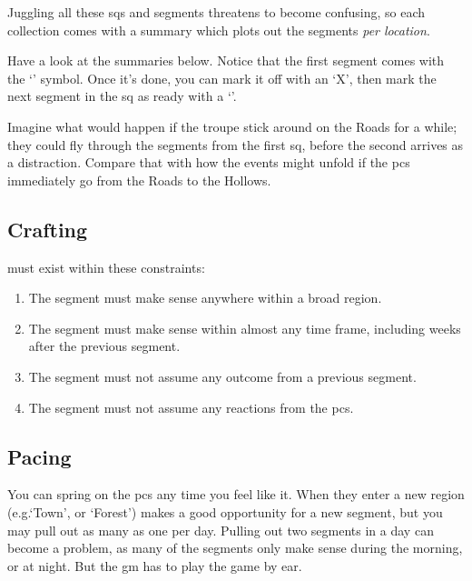 \begin{multicols}{2}

\noindent
Juggling all these \glspl{sq} and \glspl{segment} threatens to become confusing, so each collection comes with a summary which plots out the \glspl{segment} \emph{per location}.

Have a look at the summaries below.
Notice that the first \gls{segment} comes with the `\sqr' symbol.
Once it's done, you can mark it off with an `X', then mark the next \gls{segment} in the \gls{sq} as ready with a `\sqr'.

Imagine what would happen if the troupe stick around on the Roads for a while; they could fly through the \glspl{segment} from the first \gls{sq}, before the second arrives as a distraction.
Compare that with how the events might unfold if the \glspl{pc} immediately go from the Roads to the Hollows.




\subsection{Crafting }

 must exist within these constraints:

\begin{enumerate}
  \item
  The \gls{segment} must make sense anywhere within a broad region.
  \item
  The \gls{segment} must make sense within almost any time frame, including weeks after the previous \gls{segment}.
  \item
  The \gls{segment} must not assume any outcome from a previous \gls{segment}.
  \item
  The \gls{segment} must not assume any reactions from the \glspl{pc}.
\end{enumerate}

\subsection{Pacing}

You can spring  on the \glspl{pc} any time you feel like it.
When they enter a new region (e.g.`Town', or `Forest') makes a good opportunity for a new \gls{segment}, but you may pull out as many as one per day.
Pulling out two \glspl{segment} in a day can become a problem, as many of the \glspl{segment} only make sense during the morning, or at night.
But the \gls{gm} has to play the game by ear.


\end{multicols}
